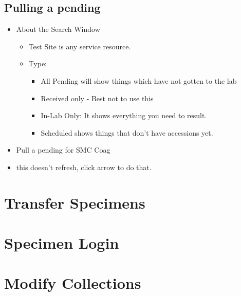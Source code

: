     \section{Pulling a pending}
        \begin{itemize}
            \item About the Search Window
            \begin{itemize}
                \item Test Site is any service resource.
                \item Type:
                    \begin{itemize}
                        \item All Pending will show things which have not gotten to the lab
                        \item Received only - Best not to use this
                        \item In-Lab Only: It shows everything you need to result.
                        \item Scheduled shows things that don't have accessions yet.
                    \end{itemize}
            \end{itemize}
            \item Pull a pending for SMC Coag
            \item this doesn't refresh, click arrow to do that.

        \end{itemize}




\chapter{Transfer Specimens}

\chapter{Specimen Login}

\chapter{Modify Collections}



\chapter{}










